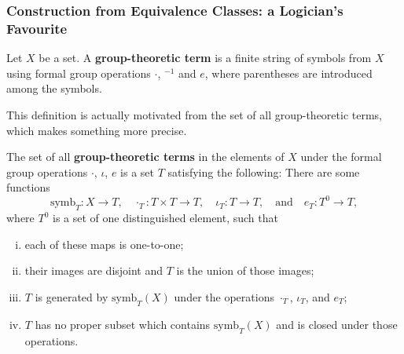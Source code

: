  

\subsubsection{Construction from Equivalence Classes: a Logician's Favourite}
\begin{definition}
	Let $X$ be a set. A \textbf{group-theoretic term} is a finite string of symbols from $X$ using formal group operations $\cdot$, ${}^{-1}$ and $e$, where  parentheses are introduced
	among the symbols.
\end{definition}
This definition is actually motivated from the set of all group-theoretic terms, which makes something more precise.
\begin{definition}
 The set of all \textbf{group-theoretic terms} in the elements of $X$ under the formal group operations $\cdot$, $\iota$, $e$ is a set $T$ satisfying the following: There are some functions
 \[
 \text{symb}_T: X \to T, \quad \cdot_T: T\times T \to T, \quad \iota_T: T \to T, \quad \text{and} \quad e_T: T^0 \to T,
 \]
 where $T^0$ is a set of one distinguished element, such that
\begin{enumerate}[(i)]
	\item  each of these maps is one-to-one;
	\item  their images are disjoint and $T$ is the union of those images; 
	\item $T$ is generated by $\text{symb}_T(X)$ under the operations $\cdot_T$, $\iota_T$, and $e_T$;
	\item $T$ has no proper subset which contains $\text{symb}_T(X)$ and is closed under those operations.
\end{enumerate}
\end{definition}

